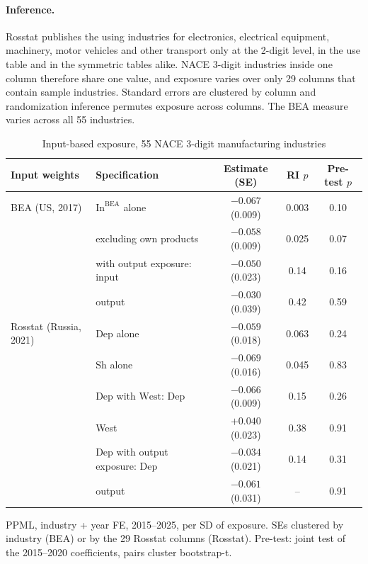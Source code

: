 \documentclass[11pt,a4paper]{article}
\begin{document}
\paragraph{Inference.} Rosstat publishes the using industries for electronics, electrical equipment, machinery,
motor vehicles and other transport only at the 2-digit level, in the use table and in the symmetric tables alike.
NACE 3-digit industries inside one column therefore share one value, and exposure varies over only 29 columns that
contain sample industries. Standard errors are clustered by column and randomization inference permutes exposure
across columns. The BEA measure varies across all 55 industries.

\begin{table}[ht]
\centering
\begin{threeparttable}
\caption{Input-based exposure, 55 NACE 3-digit manufacturing industries}
\label{tab:io}
\footnotesize
\setlength{\tabcolsep}{4pt}
\begin{tabular}{>{\raggedright\arraybackslash}p{2.6cm}>{\raggedright\arraybackslash}p{5.0cm}ccc}
\toprule
Input weights & Specification & Estimate (SE) & RI $p$ & Pre-test $p$ \\
\midrule
BEA (US, 2017) & $\mathrm{In}^{\mathrm{BEA}}$ alone & $-0.067$ (0.009) & 0.003 & 0.10 \\
 & excluding own products & $-0.058$ (0.009) & 0.025 & 0.07 \\
 & with output exposure: input & $-0.050$ (0.023) & 0.14 & 0.16 \\
 & \hspace{2.45cm}output & $-0.030$ (0.039) & 0.42 & 0.59 \\
Rosstat (Russia, 2021) & $\mathrm{Dep}$ alone & $-0.059$ (0.018) & 0.063 & 0.24 \\
 & $\mathrm{Sh}$ alone & $-0.069$ (0.016) & 0.045 & 0.83 \\
 & $\mathrm{Dep}$ with $\mathrm{West}$: Dep & $-0.066$ (0.009) & 0.15 & 0.26 \\
 & \hspace{1.95cm}West & $+0.040$ (0.023) & 0.38 & 0.91 \\
 & $\mathrm{Dep}$ with output exposure: Dep & $-0.034$ (0.021) & 0.14 & 0.31 \\
 & \hspace{3.1cm}output & $-0.061$ (0.031) & -- & 0.91 \\
\bottomrule
\end{tabular}
\begin{tablenotes}\footnotesize
\item PPML, industry + year FE, 2015--2025, per SD of exposure. SEs clustered by industry (BEA) or by the 29
Rosstat columns (Rosstat). Pre-test: joint test of the 2015--2020 coefficients, pairs cluster bootstrap-t.
\end{tablenotes}
\end{threeparttable}
\end{table}
\end{document}
